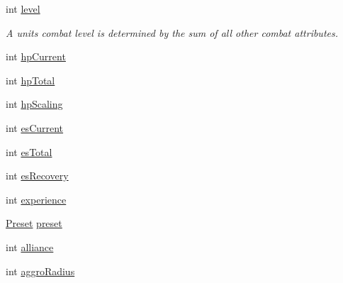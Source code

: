 \begin{DoxyCompactItemize}
int \mbox{\hyperlink{class_attributes_a1ff4257de32284cf7489849787cb82fb}{level}}
\begin{DoxyCompactList}\small\item\em A unit\textquotesingle{}s combat level is determined by the sum of all other combat attributes. \end{DoxyCompactList}\item 
int \mbox{\hyperlink{class_attributes_afad13915acdb266becba4aa8da86c8d1}{hp\+Current}}
\item 
int \mbox{\hyperlink{class_attributes_a61de3d3141922807c7c77fc86819b934}{hp\+Total}}
\item 
int \mbox{\hyperlink{class_attributes_a446ba39447eafcd8d839e97d7c890fb6}{hp\+Scaling}}
\item 
int \mbox{\hyperlink{class_attributes_a3375ff1328de584253cee341d9bec06d}{es\+Current}}
\item 
int \mbox{\hyperlink{class_attributes_ac498aafac370d3b483ea00bbfde9802a}{es\+Total}}
\item 
int \mbox{\hyperlink{class_attributes_a898ca057c4069221111ae9825047bd66}{es\+Recovery}}
\item 
int \mbox{\hyperlink{class_attributes_a43e363930def648b36c6e420290f215c}{experience}}
\item 
\mbox{\hyperlink{class_attributes_a2dcc4757e5dd7b7d518f43f4f194d175}{Preset}} \mbox{\hyperlink{class_attributes_ad6b0d037f9b58413a7cb7be3065cf743}{preset}}
\item 
int \mbox{\hyperlink{class_attributes_a8b2810971ac5f6ab1ec3c0b00498ee5b}{alliance}}
\item 
int \mbox{\hyperlink{class_attributes_aeb2c4d8fb766486fb2302a8e196594a3}{aggro\+Radius}}
\end{DoxyCompactItemize}


